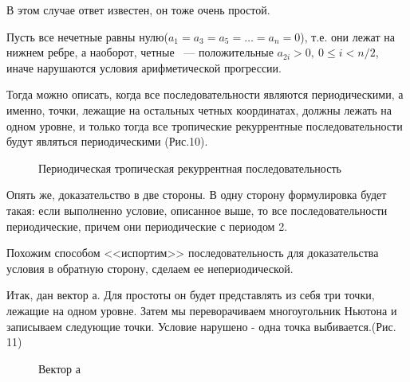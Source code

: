 \documentclass[russian]{lecture-notes}
\begin{document}
В этом случае ответ известен, он тоже очень простой.

Пусть все нечетные равны нулю($a_1=a_3=a_5=\ldots =a_n=0$), т.е. они лежат на нижнем ребре, а наоборот, четные ~--- положительные $a_{2i}>0,\:0\leq i<n/2$, иначе нарушаются условия арифметической прогрессии.

Тогда можно описать, когда все последовательности являются периодическими, а именно, точки, лежащие на остальных четных координатах, должны лежать на одном уровне, и только тогда все тропические рекуррентные последовательности будут являться периодическими (Рис.10).

\begin{figure}[h!]
\caption{Периодическая тропическая рекуррентная последовательность}
\end{figure}


Опять же, доказательство в две стороны. В одну сторону формулировка будет такая: если выполненно условие, описанное выше, то все последовательности периодические, причем они
периодические с периодом 2.

Похожим способом <<испортим>> последовательность для доказательства условия в обратную сторону, сделаем ее непериодической.


Итак, дан вектор а. Для простоты он будет представлять из себя три точки, лежащие на одном уровне. Затем мы переворачиваем многоугольник Ньютона и записываем следующие точки. Условие нарушено - одна точка выбивается.(Рис. 11)

\begin{figure}[h!]
\caption{Вектор а}
\end{figure}
\end{document}
